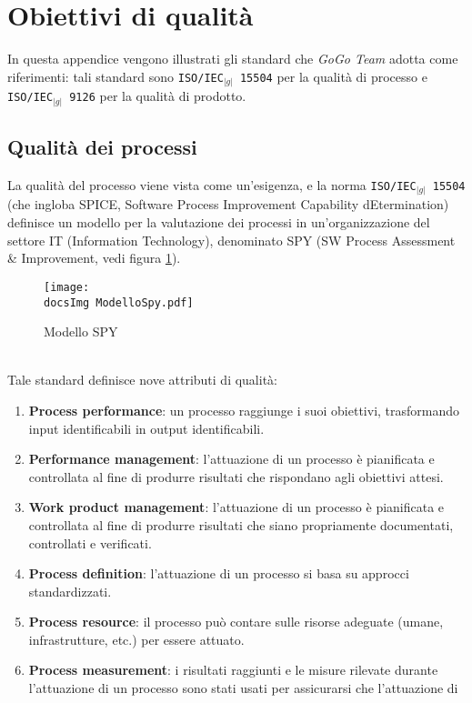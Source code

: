 \appendix
\appendixpage
\addappheadtotoc
\section{Obiettivi di qualità}
  \label{sec:Qualita}
  	In questa appendice vengono illustrati gli standard che \textit{GoGo Team} adotta come riferimenti: tali standard sono \texttt{ISO/IEC$_{|g|}$ 15504} per la qualità di processo e \texttt{ISO/IEC$_{|g|}$ 9126} per la qualità di prodotto.
    \subsection{Qualità dei processi}{
	La qualità del processo viene vista come un’esigenza, e la norma \texttt{ISO/IEC$_{|g|}$ 15504} (che ingloba SPICE, Software Process Improvement Capability dEtermination) 
	definisce un modello per la valutazione dei processi in un'organizzazione del settore IT (Information Technology), denominato SPY (SW Process Assessment \& Improvement, 
	vedi figura \ref{fig:ModelloSpy}).
	\begin{figure}[h!]
	    \centering
	    \texttt{[image: \\docsImg ModelloSpy.pdf]}
	    \caption{Modello SPY}
	    \label{fig:ModelloSpy}
	\end{figure} \\
	Tale standard definisce nove attributi di qualità:
	\begin{enumerate}
	    \item \textbf{Process performance}: un processo raggiunge i suoi obiettivi, trasformando input identificabili in output identificabili.
	    \item \textbf{Performance management}: l’attuazione di un processo è pianificata e controllata al fine di produrre risultati che rispondano agli obiettivi attesi.
	    \item \textbf{Work product management}: l’attuazione di un processo è pianificata e controllata al fine di produrre risultati che siano propriamente documentati, 
		  controllati e verificati.
	    \item \textbf{Process definition}: l’attuazione di un processo si basa su approcci standardizzati.
	    \item \textbf{Process resource}: il processo può contare sulle risorse adeguate (umane, infrastrutture, etc.) per essere attuato.
	    \item \textbf{Process measurement}: i risultati raggiunti e le misure rilevate durante l’attuazione di un processo sono stati usati per assicurarsi che l’attuazione di 

\end{enumerate}}
